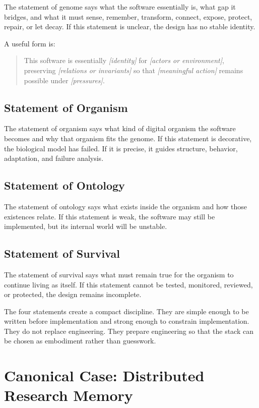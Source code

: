 \documentclass[11pt]{article}
\begin{document}
The statement of genome says what the software essentially is, what gap it bridges, and what it must sense, remember, transform, connect, expose, protect, repair, or let decay. If this statement is unclear, the design has no stable identity.

A useful form is:

\begin{quote}
This software is essentially \emph{[identity]} for \emph{[actors or environment]}, preserving \emph{[relations or invariants]} so that \emph{[meaningful action]} remains possible under \emph{[pressures]}.
\end{quote}

\subsection{Statement of Organism}

The statement of organism says what kind of digital organism the software becomes and why that organism fits the genome. If this statement is decorative, the biological model has failed. If it is precise, it guides structure, behavior, adaptation, and failure analysis.

\subsection{Statement of Ontology}

The statement of ontology says what exists inside the organism and how those existences relate. If this statement is weak, the software may still be implemented, but its internal world will be unstable.

\subsection{Statement of Survival}

The statement of survival says what must remain true for the organism to continue living as itself. If this statement cannot be tested, monitored, reviewed, or protected, the design remains incomplete.

The four statements create a compact discipline. They are simple enough to be written before implementation and strong enough to constrain implementation. They do not replace engineering. They prepare engineering so that the stack can be chosen as embodiment rather than guesswork.

\section{Canonical Case: Distributed Research Memory}
\end{document}

